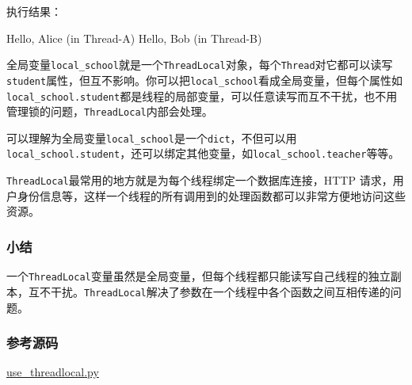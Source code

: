 执行结果：

\begin{pythoncode}
Hello, Alice (in Thread-A)
Hello, Bob (in Thread-B)
\end{pythoncode}

全局变量\texttt{local\_school}就是一个\texttt{ThreadLocal}对象，每个\texttt{Thread}对它都可以读写\texttt{student}属性，但互不影响。你可以把\texttt{local\_school}看成全局变量，但每个属性如\texttt{local\_school.student}都是线程的局部变量，可以任意读写而互不干扰，也不用管理锁的问题，\texttt{ThreadLocal}内部会处理。

可以理解为全局变量\texttt{local\_school}是一个\texttt{dict}，不但可以用\texttt{local\_school.student}，还可以绑定其他变量，如\texttt{local\_school.teacher}等等。

\texttt{ThreadLocal}最常用的地方就是为每个线程绑定一个数据库连接，HTTP
请求，用户身份信息等，这样一个线程的所有调用到的处理函数都可以非常方便地访问这些资源。

\hypertarget{ux5c0fux7ed3}{%
\subsubsection{小结}\label{ux5c0fux7ed3}}

一个\texttt{ThreadLocal}变量虽然是全局变量，但每个线程都只能读写自己线程的独立副本，互不干扰。\texttt{ThreadLocal}解决了参数在一个线程中各个函数之间互相传递的问题。

\hypertarget{ux53c2ux8003ux6e90ux7801}{%
\subsubsection{参考源码}\label{ux53c2ux8003ux6e90ux7801}}

\href{https://github.com/michaelliao/learn-python3/blob/master/samples/multitask/use_threadlocal.py}{use\_threadlocal.py}

